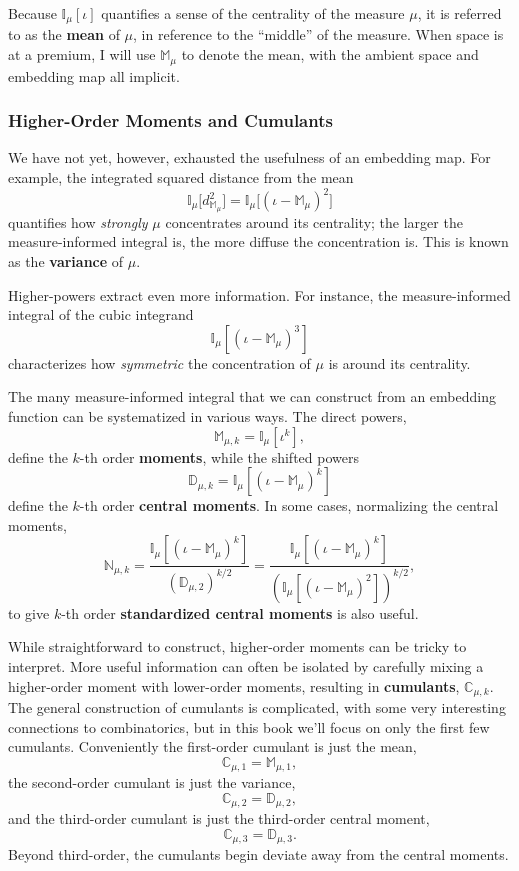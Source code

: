 \documentclass[
  letterpaper,
  DIV=11,
  numbers=noendperiod]{scrartcl}
\begin{document}
Because \(\mathbb{I}_{\mu} \left[ \iota \right]\) quantifies a sense of
the centrality of the measure \(\mu\), it is referred to as the
\textbf{mean} of \(\mu\), in reference to the ``middle'' of the measure.
When space is at a premium, I will use \(\mathbb{M}_{\mu}\) to denote
the mean, with the ambient space and embedding map all implicit.

\subsubsection{Higher-Order Moments and
Cumulants}\label{higher-order-moments-and-cumulants}

We have not yet, however, exhausted the usefulness of an embedding map.
For example, the integrated squared distance from the mean \[
\mathbb{I}_{\mu} \bigg[ d_{\mathbb{M}_{\mu}}^{2} \bigg]
=
\mathbb{I}_{\mu} \bigg[ (\iota - \mathbb{M}_{\mu})^{2} \bigg]
\] quantifies how \emph{strongly} \(\mu\) concentrates around its
centrality; the larger the measure-informed integral is, the more
diffuse the concentration is. This is known as the \textbf{variance} of
\(\mu\).

Higher-powers extract even more information. For instance, the
measure-informed integral of the cubic integrand \[
\mathbb{I}_{\mu} \left[ (\iota - \mathbb{M}_{\mu})^{3} \right]
\] characterizes how \emph{symmetric} the concentration of \(\mu\) is
around its centrality.

The many measure-informed integral that we can construct from an
embedding function can be systematized in various ways. The direct
powers, \[
\mathbb{M}_{\mu, k} = \mathbb{I}_{\mu} \left[ \iota^{k} \right],
\] define the \(k\)-th order \textbf{moments}, while the shifted powers
\[
\mathbb{D}_{\mu, k} =
\mathbb{I}_{\mu} \left[ (\iota - \mathbb{M}_{\mu})^{k} \right]
\] define the \(k\)-th order \textbf{central moments}. In some cases,
normalizing the central moments, \[
\mathbb{N}_{\mu, k} =
\frac{ \mathbb{I}_{\mu}
\left[ (\iota - \mathbb{M}_{\mu})^{k} \right] }
{ (\mathbb{D}_{\mu, 2})^{k / 2} }
=
\frac{ \mathbb{I}_{\mu}
\left[ (\iota - \mathbb{M}_{\mu})^{k} \right] }
{ \left(
    \mathbb{I}_{\mu} \left[ (\iota - \mathbb{M}_{\mu})^{2} \right]
  \right)^{k / 2} },
\] to give \(k\)-th order \textbf{standardized central moments} is also
useful.

While straightforward to construct, higher-order moments can be tricky
to interpret. More useful information can often be isolated by carefully
mixing a higher-order moment with lower-order moments, resulting in
\textbf{cumulants}, \(\mathbb{C}_{\mu, k}\). The general construction of
cumulants is complicated, with some very interesting connections to
combinatorics, but in this book we'll focus on only the first few
cumulants. Conveniently the first-order cumulant is just the mean, \[
\mathbb{C}_{\mu, 1} = \mathbb{M}_{\mu, 1},
\] the second-order cumulant is just the variance, \[
\mathbb{C}_{\mu, 2} = \mathbb{D}_{\mu, 2},
\] and the third-order cumulant is just the third-order central moment,
\[
\mathbb{C}_{\mu, 3} = \mathbb{D}_{\mu, 3}.
\] Beyond third-order, the cumulants begin deviate away from the central
moments.
\end{document}

